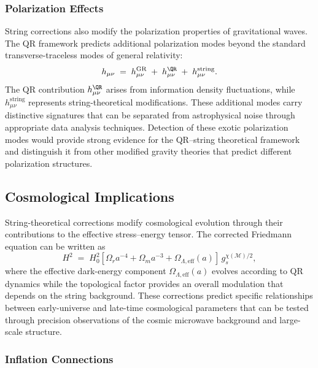 \subsubsection{Polarization Effects}
\label{subsubsec:polarization-effects}

String corrections also modify the polarization properties of gravitational waves. The QR framework predicts additional polarization modes beyond the standard transverse-traceless modes of general relativity:
\begin{equation}
h_{\mu\nu} \;=\; h_{\mu\nu}^{\text{GR}} \;+\; h_{\mu\nu}^{\QR} \;+\; h_{\mu\nu}^{\text{string}} .
\label{eq:polarization-decomposition}
\end{equation}
The QR contribution $h_{\mu\nu}^{\QR}$ arises from information density fluctuations, while $h_{\mu\nu}^{\text{string}}$ represents string-theoretical modifications. These additional modes carry distinctive signatures that can be separated from astrophysical noise through appropriate data analysis techniques. Detection of these exotic polarization modes would provide strong evidence for the QR–string theoretical framework and distinguish it from other modified gravity theories that predict different polarization structures.

\subsection{Cosmological Implications}
\label{subsec:cosmological-implications}

String-theoretical corrections modify cosmological evolution through their contributions to the effective stress–energy tensor. The corrected Friedmann equation can be written as
\begin{equation}
H^2 \;=\; H_0^2 \left[\Omega_r a^{-4} + \Omega_m a^{-3} + \Omega_{\Lambda,\text{eff}}(a)\right]\,
g_s^{\chi(\mathcal{M})/2} ,
\label{eq:string-corrected-friedmann}
\end{equation}
where the effective dark-energy component $\Omega_{\Lambda,\text{eff}}(a)$ evolves according to QR dynamics while the topological factor provides an overall modulation that depends on the string background. These corrections predict specific relationships between early-universe and late-time cosmological parameters that can be tested through precision observations of the cosmic microwave background and large-scale structure.

\subsubsection{Inflation Connections}
\label{subsubsec:inflation-connections}

